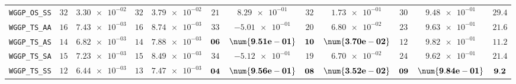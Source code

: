 \begin{xltabular}{\textwidth}{l||cC|cC|cC|cC|cC||c}
	\texttt{WGGP\_OS\_SS} & $ 32$ & $ \num{3.30e-02}$ & $ 32$ & $ \num{3.79e-02}$ & $ 21$ & $ \num{8.29e-01}$ & $ 32$ & $ \num{1.73e-01}$ & $ 30$ & $ \num{9.48e-01}$ & $ 29.4$  \\
	\texttt{WGGP\_TS\_AA} & $ 16$ & $ \num{7.43e-03}$ & $ 16$ & $ \num{8.74e-03}$ & $ 33$ & $ \num{-5.01e-01}$ & $ 20$ & $ \num{6.80e-02}$ & $ 23$ & $ \num{9.63e-01}$ & $ 21.6$  \\
	\texttt{WGGP\_TS\_AS} & $ 14$ & $ \num{6.82e-03}$ & $ 14$ & $ \num{7.88e-03}$ & $\bf 06$ & $\bf \num{9.51e-01}$ & $\bf 10$ & $\bf \num{3.70e-02}$ & $ 12$ & $ \num{9.82e-01}$ & $ 11.2$  \\
	\texttt{WGGP\_TS\_SA} & $ 15$ & $ \num{7.23e-03}$ & $ 15$ & $ \num{8.49e-03}$ & $ 34$ & $ \num{-5.12e-01}$ & $ 19$ & $ \num{6.70e-02}$ & $ 24$ & $ \num{9.62e-01}$ & $ 21.4$  \\
	\texttt{WGGP\_TS\_SS} & $ 12$ & $ \num{6.44e-03}$ & $ 13$ & $ \num{7.47e-03}$ & $\bf 04$ & $\bf \num{9.56e-01}$ & $\bf 08$ & $\bf \num{3.52e-02}$ & $\bf 09$ & $\bf \num{9.84e-01}$ & $\bf 9.2$  \\
\end{xltabular}

